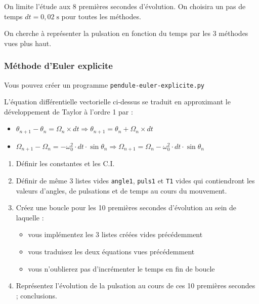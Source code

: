 \documentclass[11pt]{article}
\begin{document}
  \smallskip
  
    On limite l'étude aux 8 premières secondes d'évolution. On choisira un pas de temps $dt = 0,02\;\text{s}$ pour toutes les méthodes.
    
\smallskip

On cherche à représenter la pulsation en fonction du temps par les 3 méthodes vues plus haut.




\subsubsection{Méthode d'Euler explicite}


Vous pouvez créer un programme \texttt{pendule-euler-explicite.py}

\smallskip


L'équation différentielle vectorielle ci-dessus se traduit en approximant le développement de Taylor à l'ordre 1 par :

\begin{itemize}
 \item $\theta_{n+1} - \theta_n = \Omega_n\times dt \Longrightarrow \theta_{n+1} = \theta_n + \Omega_n\times dt $
 \item  $\Omega_{n+1} - \Omega_n = -\omega_0^2\cdot dt\cdot \sin \theta_n \Longrightarrow \Omega_{n+1} = \Omega_n -\omega_0^2\cdot dt\cdot \sin \theta_n$
\end{itemize}




\begin{enumerate}
 \item Définir les constantes et les C.I.
 \item Définir de même 3 listes vides \texttt{angle1}, \texttt{puls1} et \texttt{T1} vides qui contiendront les valeurs d'angles, de pulsations et de temps au cours du mouvement.
 \item Créez une boucle pour les 10 premières secondes d'évolution au sein de laquelle : 
 \begin{itemize}
  \item vous implémentez les 3 listes créées vides précédemment
  \item vous traduisez les deux équations vues précédemment
  \item vous n'oublierez pas d'incrémenter le temps en fin de boucle
 \end{itemize}

 \item Représentez l'évolution de la pulsation au cours de ces 10 premières secondes ; conclusions.
\end{enumerate}
\end{document}
